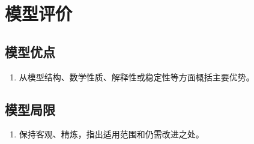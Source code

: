 \section{模型评价}
\subsection{模型优点}
\begin{enumerate}
  \item 从模型结构、数学性质、解释性或稳定性等方面概括主要优势。
\end{enumerate}
\subsection{模型局限}
\begin{enumerate}
  \item 保持客观、精炼，指出适用范围和仍需改进之处。
\end{enumerate}
